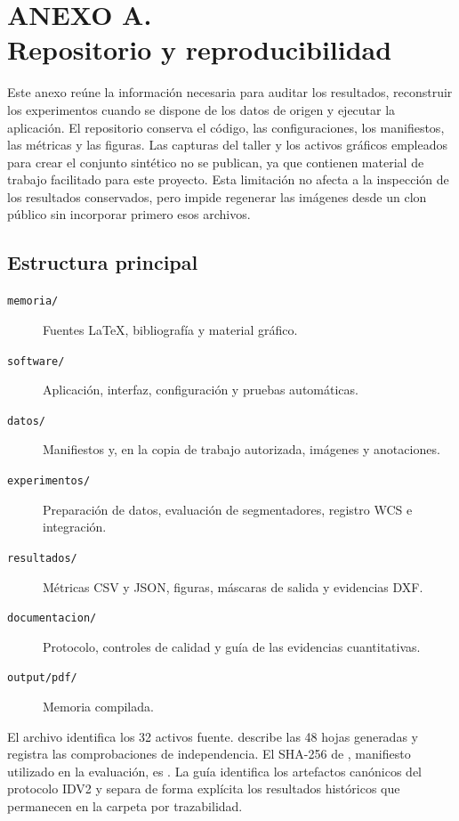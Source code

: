 \chapter*{ANEXO A.\\Repositorio y reproducibilidad}
\setcounter{section}{0}
\renewcommand{\thesection}{A.\arabic{section}}

Este anexo reúne la información necesaria para auditar los resultados, reconstruir los experimentos cuando se dispone de los datos de origen y ejecutar la aplicación. El repositorio conserva el código, las configuraciones, los manifiestos, las métricas y las figuras. Las capturas del taller y los activos gráficos empleados para crear el conjunto sintético no se publican, ya que contienen material de trabajo facilitado para este proyecto. Esta limitación no afecta a la inspección de los resultados conservados, pero impide regenerar las imágenes desde un clon público sin incorporar primero esos archivos.

\section{Estructura principal}

\begin{description}
    \item[\texttt{memoria/}] Fuentes \LaTeX, bibliografía y material gráfico.
    \item[\texttt{software/}] Aplicación, interfaz, configuración y pruebas automáticas.
    \item[\texttt{datos/}] Manifiestos y, en la copia de trabajo autorizada, imágenes y anotaciones.
    \item[\texttt{experimentos/}] Preparación de datos, evaluación de segmentadores, registro WCS e integración.
    \item[\texttt{resultados/}] Métricas CSV y JSON, figuras, máscaras de salida y evidencias DXF.
    \item[\texttt{documentacion/}] Protocolo, controles de calidad y guía de las evidencias cuantitativas.
    \item[\texttt{output/pdf/}] Memoria compilada.
\end{description}

El archivo  identifica los 32 activos fuente.  describe las 48 hojas generadas y  registra las comprobaciones de independencia. El SHA-256 de , manifiesto utilizado en la evaluación, es \texttt{}. La guía  identifica los artefactos canónicos del protocolo IDV2 y separa de forma explícita los resultados históricos que permanecen en la carpeta por trazabilidad.


